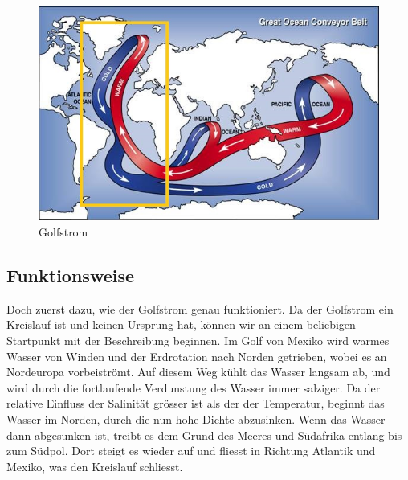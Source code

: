 \begin{figure}
	\includegraphics[width=12cm]{thermohalin/Bilder/Deep-Ocean-Currents.jpg}
	\centering
	\caption{Golfstrom}
\end{figure}



\subsection{Funktionsweise}

Doch zuerst dazu, wie der Golfstrom genau funktioniert.
Da der Golfstrom ein Kreislauf ist und keinen Ursprung hat, können wir an einem beliebigen Startpunkt mit der Beschreibung beginnen. Im Golf von Mexiko wird warmes Wasser von Winden und der Erdrotation nach Norden getrieben, wobei es an Nordeuropa vorbeiströmt.
Auf diesem Weg kühlt das Wasser langsam ab, und wird durch die fortlaufende Verdunstung des Wasser immer salziger. Da der relative Einfluss der Salinität grösser ist als der der Temperatur, beginnt das Wasser im Norden, durch die nun hohe Dichte abzusinken. Wenn das Wasser dann abgesunken ist, treibt es dem Grund des Meeres und Südafrika entlang bis zum Südpol. Dort steigt es wieder  auf und fliesst in Richtung Atlantik und Mexiko, was den Kreislauf schliesst.

